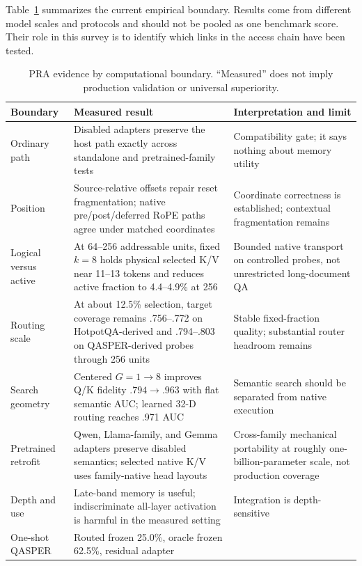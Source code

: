 Table~\ref{tab:pra-evidence-ledger} summarizes the current empirical boundary. Results come
from different model scales and protocols and should not be pooled as one benchmark score.
Their role in this survey is to identify which links in the access chain have been tested.

\begin{table}[htbp]
\centering\scriptsize
\caption{PRA evidence by computational boundary. ``Measured'' does not imply production
validation or universal superiority.}
\label{tab:pra-evidence-ledger}
\begin{tabular}{>{\raggedright\arraybackslash}p{2.5cm}>{\raggedright\arraybackslash}p{6.1cm}>{\raggedright\arraybackslash}p{5.8cm}}
\toprule
Boundary & Measured result & Interpretation and limit \\\midrule
Ordinary path & Disabled adapters preserve the host path exactly across standalone and
pretrained-family tests & Compatibility gate; it says nothing about memory utility \\
Position & Source-relative offsets repair reset fragmentation; native pre/post/deferred RoPE
paths agree under matched coordinates & Coordinate correctness is established; contextual
fragmentation remains \\
Logical versus active & At 64--256 addressable units, fixed $k=8$ holds physical selected K/V
near 11--13 tokens and reduces active fraction to 4.4--4.9\% at 256 & Bounded native transport
on controlled probes, not unrestricted long-document QA \\
Routing scale & At about 12.5\% selection, target coverage remains .756--.772 on
HotpotQA-derived and .794--.803 on QASPER-derived probes through 256 units & Stable fixed-fraction
quality; substantial router headroom remains \\
Search geometry & Centered $G=1\rightarrow8$ improves Q/K fidelity $.794\rightarrow.963$ with
flat semantic AUC; learned 32-D routing reaches .971 AUC & Semantic search should be separated
from native execution \\
Pretrained retrofit & Qwen, Llama-family, and Gemma adapters preserve disabled semantics;
selected native K/V uses family-native head layouts & Cross-family mechanical portability at
roughly one-billion-parameter scale, not production coverage \\
Depth and use & Late-band memory is useful; indiscriminate all-layer activation is harmful in
the measured setting & Integration is depth-sensitive \\
One-shot QASPER & Routed frozen 25.0\%, oracle frozen 62.5\%, residual adapter

\end{tabular}
\end{table}
